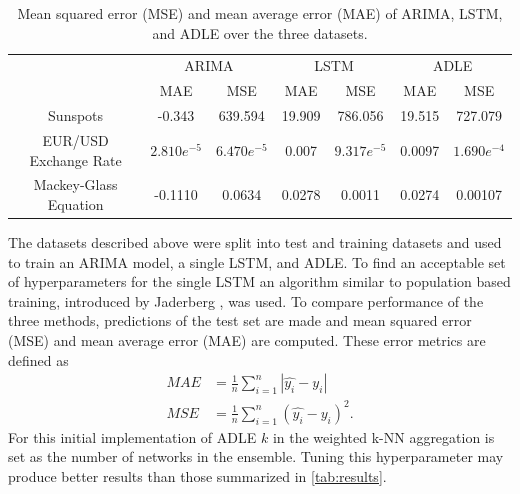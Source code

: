 \documentclass{article}
\begin{document}
\begin{table}
	\centering
    \bgroup
	\def\arraystretch{1.5}
	\begin{tabular}{|c|c|c|c|c|c|c|}
		\hline
        & \multicolumn{2}{|c|}{ARIMA} & \multicolumn{2}{|c|}{LSTM} & \multicolumn{2}{|c|}{ADLE}\\ 
        & MAE & MSE & MAE & MSE & MAE & MSE \\
        \hline
        Sunspots & -0.343 & 639.594 & 19.909 & 786.056 & 19.515 & 727.079 \\
        \hline
        EUR/USD Exchange Rate & $2.810e^{-5}$ & $6.470e^{-5}$ & 0.007 & $9.317e^{-5}$ & 0.0097 & $1.690e^{-4}$ \\
        \hline 
        Mackey-Glass Equation & -0.1110 & 0.0634 & 0.0278 & 0.0011 & 0.0274 & 0.00107 \\
        \hline
	\end{tabular}
    \egroup
    \caption{Mean squared error (MSE) and mean average error (MAE) of ARIMA, LSTM, and ADLE over the three datasets.}
    \label{tab:results}
\end{table}




The datasets described above were split into test and training datasets and used to train an ARIMA model, a single LSTM, and ADLE. To find an acceptable set of hyperparameters for the single LSTM an algorithm similar to population based training, introduced by Jaderberg \citep{DBLP:journals/corr/abs-1711-09846}, was used. To compare performance of the three methods, predictions of the test set are made and mean squared error (MSE) and mean average error (MAE) are computed. These error metrics are defined as 
\begin{align*}
	MAE &= \frac{1}{n} \sum_{i=1}^n |\hat{y_i} - y_i| \\
    MSE &= \frac{1}{n} \sum_{i=1}^n (\hat{y_i} - y_i)^2.
\end{align*}
For this initial implementation of ADLE $k$ in the weighted k-NN aggregation is set as the number of networks in the ensemble. Tuning this hyperparameter may produce better results than those summarized in \autoref{tab:results}.
\end{document}
